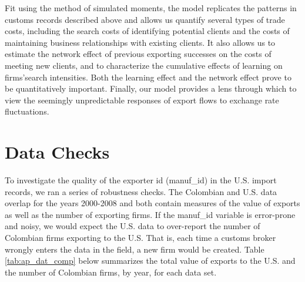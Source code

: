 Fit using the method of simulated moments, the model replicates the patterns
in customs records described above and allows us quantify several types of
trade costs, including the search costs of identifying potential clients and
the costs of maintaining business relationships with existing clients. It
also allows us to estimate the network effect of previous exporting
successes on the costs of meeting new clients, and to characterize the
cumulative effects of learning on firms'search intensities. Both the
learning effect and the network effect prove to be quantitatively important.
Finally, our model provides a lens through which to view the seemingly
unpredictable responses of export flows to exchange rate fluctuations.

\section{Data Checks}
\label{sec:data_check}

To investigate the quality of the exporter id (manuf\_id) in the U.S. import
records, we ran a series of robustness checks. The Colombian and U.S. data
overlap for the years 2000-2008 and both contain measures of the value of
exports as well as the number of exporting firms. If the manuf\_id variable
is error-prone and noisy, we would expect the U.S. data to over-report the
number of Colombian firms exporting to the U.S. That is, each time a customs
broker wrongly enters the data in the field, a new firm would be created.
Table \ref{tab:ap_dat_comp} below summarizes the total value of exports to the U.S. and the
number of Colombian firms, by year, for each data set.


